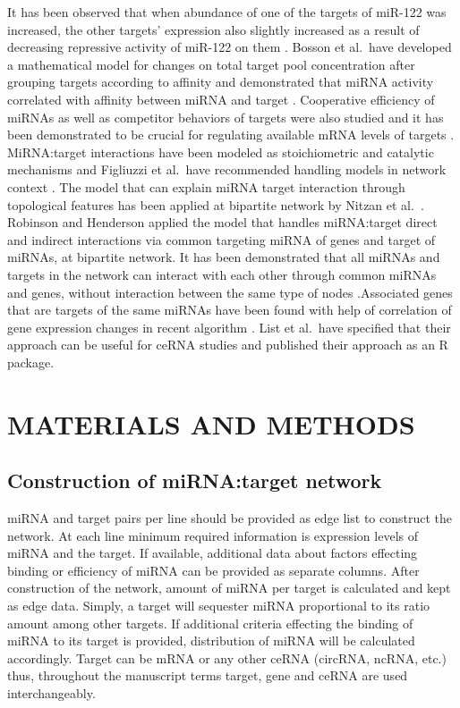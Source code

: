 \documentclass[a4,center,fleqn]{NAR}
\begin{document}
\enlargethispage{-65.1pt}

It has been observed that when abundance of one of the targets of
miR-122 was increased, the other targets' expression also slightly
increased as a result of decreasing repressive activity of miR-122 on
them \citep{denzler_assessing_2014}. Bosson et al.~have developed a
mathematical model for changes on total target pool concentration after
grouping targets according to affinity and demonstrated that miRNA
activity correlated with affinity between miRNA and target
\citep{bosson_endogenous_2014}. Cooperative efficiency of miRNAs as well
as competitor behaviors of targets were also studied and it has been
demonstrated to be crucial for regulating available mRNA levels of
targets \citep{denzler_impact_2016}. MiRNA:target interactions have been
modeled as stoichiometric and catalytic mechanisms and Figliuzzi et
al.~have recommended handling models in network context
\citep{figliuzzi_micrornas_2013}. The model that can explain miRNA
target interaction through topological features has been applied at
bipartite network by Nitzan et al.~\citep{nitzan_interactions_2014}.
Robinson and Henderson applied the model that handles miRNA:target
direct and indirect interactions via common targeting miRNA of genes and
target of miRNAs, at bipartite network. It has been demonstrated that
all miRNAs and targets in the network can interact with each other
through common miRNAs and genes, without interaction between the same
type of nodes \citep{robinson_modelling_2018}.Associated genes that are
targets of the same miRNAs have been found with help of correlation of
gene expression changes in recent algorithm
\citep{markus_list_sponge_2017}. List et al.~have specified that their
approach can be useful for ceRNA studies and published their approach as
an R package.

\section{MATERIALS AND METHODS}

\subsection{Construction of miRNA:target network}

miRNA and target pairs per line should be provided as edge list to
construct the network. At each line minimum required information is
expression levels of miRNA and the target. If available, additional data
about factors effecting binding or efficiency of miRNA can be provided
as separate columns. After construction of the network, amount of miRNA
per target is calculated and kept as edge data. Simply, a target will
sequester miRNA proportional to its ratio amount among other targets. If
additional criteria effecting the binding of miRNA to its target is
provided, distribution of miRNA will be calculated accordingly. Target
can be mRNA or any other ceRNA (circRNA, ncRNA, etc.) thus, throughout
the manuscript terms target, gene and ceRNA are used interchangeably.
\end{document}
